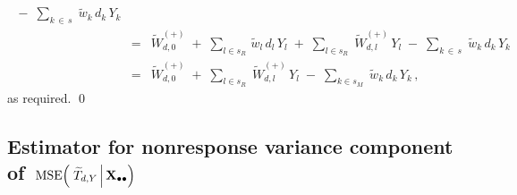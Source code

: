 \begin{enumerate}
\begin{eqnarray*}
        \;-\;
        \underset{k\,\in\,s}{\sum}\;\widetilde{w}_{k}\,d_{k}\,Y_{k}
    \\
    & = &
        \widetilde{W}^{(+)}_{d,0}
        \;+\;
        \underset{l \in s_{R}}{\sum}\,\widetilde{w}_{l}\,d_{l}\,Y_{l}
        \;+\;
        \underset{l \in s_{R}}{\sum}\;\widetilde{W}^{(+)}_{d,l}\,Y_{l}
        \;-\;
        \underset{k\,\in\,s}{\sum}\;\widetilde{w}_{k}\,d_{k}\,Y_{k}
    \\
    & = &
        \widetilde{W}^{(+)}_{d,0}
        \;+\;
        \underset{l \in s_{R}}{\sum}\;\widetilde{W}^{(+)}_{d,l}\,Y_{l}
        \;-\;
        \underset{k \in s_{M}}{\sum}\;\widetilde{w}_{k}\,d_{k}\,Y_{k}\,,
    \end{eqnarray*}
    as required.
    \qed
\end{enumerate}


\clearpage
\subsection{Estimator for nonresponse variance component of
\,$\textnormal{MSE}\!\left(\,\left.\widetilde{T}_{d,Y}\,\right\vert\mathbf{X}_{\bullet\bullet}\right)$}
\setcounter{theorem}{0}


